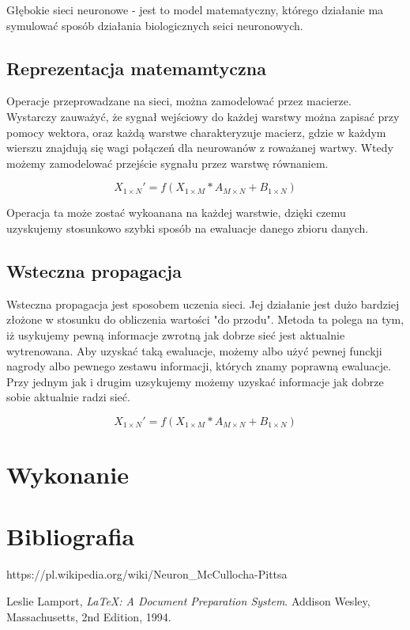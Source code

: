 \documentclass{article}
\begin{document}
Głębokie sieci neuronowe - jest to model matematyczny, którego działanie ma symulować sposób działania biologicznych seici neuronowych.

\subsection{Reprezentacja matemamtyczna}
Operacje przeprowadzane na sieci, można zamodelować przez macierze. Wystarczy zauważyć, że sygnał wejściowy do każdej warstwy można zapisać przy pomocy wektora, oraz każdą warstwe charakteryzuje macierz, gdzie w każdym wierszu znajdują się wagi połączeń dla neurowanów z roważanej wartwy. Wtedy możemy zamodelować przejście sygnału przez warstwę równaniem.

\begin{equation}
    X_{1 \times N}' = f(X_{1 \times M}*A_{M \times N} + B_{1 \times N})
\end{equation}

Operacja ta może zostać wykoanana na każdej warstwie, dzięki czemu uzyskujemy stosunkowo szybki sposób na ewaluacje danego zbioru danych.

\subsection{Wsteczna propagacja}
Wsteczna propagacja jest sposobem uczenia sieci. Jej działanie jest dużo bardziej złożone w stosunku do obliczenia wartości "do przodu". Metoda ta polega na tym, iż usykujemy pewną informacje zwrotną jak dobrze sieć jest aktualnie wytrenowana. Aby uzyskać taką ewaluacje, możemy albo użyć pewnej funckji nagrody albo pewnego zestawu informacji, których znamy poprawną ewaluacje. Przy jednym jak i drugim uzsykujemy możemy uzyskać informacje jak dobrze sobie aktualnie radzi sieć.

\begin{equation}
    X_{1 \times N}' = f(X_{1 \times M}*A_{M \times N} + B_{1 \times N})
\end{equation}



\section{Wykonanie}

\section{Bibliografia}

\begin{thebibliography}{9}


    https://pl.wikipedia.org/wiki/Neuron\_McCullocha-Pittsa

  Leslie Lamport,
  \emph{\LaTeX: A Document Preparation System}.
  Addison Wesley, Massachusetts,
  2nd Edition,
  1994.

\end{thebibliography}
\end{document}
